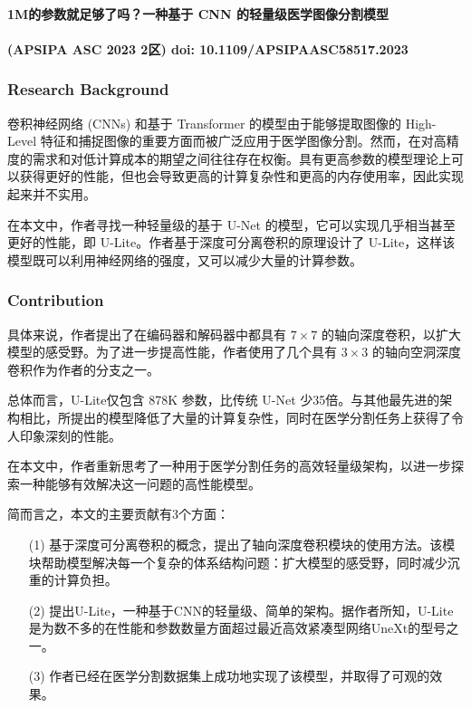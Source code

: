 \documentclass[a4paper, 10pt]{article}
\begin{document}
		\paragraph{1M的参数就足够了吗？一种基于 CNN 的轻量级医学图像分割模型}
		
		\paragraph{(APSIPA ASC 2023 2区) doi: 10.1109/APSIPAASC58517.2023}
		
			\subsubsection{Research Background}
			
			卷积神经网络 (CNNs) 和基于 Transformer 的模型由于能够提取图像的 High-Level 特征和捕捉图像的重要方面而被广泛应用于医学图像分割。然而，在对高精度的需求和对低计算成本的期望之间往往存在权衡。具有更高参数的模型理论上可以获得更好的性能，但也会导致更高的计算复杂性和更高的内存使用率，因此实现起来并不实用。
			
			在本文中，作者寻找一种轻量级的基于 U-Net 的模型，它可以实现几乎相当甚至更好的性能，即 U-Lite。作者基于深度可分离卷积的原理设计了 U-Lite，这样该模型既可以利用神经网络的强度，又可以减少大量的计算参数。
			
			\subsubsection{Contribution}
			
			具体来说，作者提出了在编码器和解码器中都具有 $7\times7$ 的轴向深度卷积，以扩大模型的感受野。为了进一步提高性能，作者使用了几个具有 $3\times3$ 的轴向空洞深度卷积作为作者的分支之一。
			
			总体而言，U-Lite仅包含 878K 参数，比传统 U-Net 少35倍。与其他最先进的架构相比，所提出的模型降低了大量的计算复杂性，同时在医学分割任务上获得了令人印象深刻的性能。
			
			在本文中，作者重新思考了一种用于医学分割任务的高效轻量级架构，以进一步探索一种能够有效解决这一问题的高性能模型。
			
			简而言之，本文的主要贡献有3个方面：

			\begin{itemize}
				\item[(1)] 基于深度可分离卷积的概念，提出了轴向深度卷积模块的使用方法。该模块帮助模型解决每一个复杂的体系结构问题：扩大模型的感受野，同时减少沉重的计算负担。
				
				\item[(2)] 提出U-Lite，一种基于CNN的轻量级、简单的架构。据作者所知，U-Lite是为数不多的在性能和参数数量方面超过最近高效紧凑型网络UneXt的型号之一。
				
				\item[(3)] 作者已经在医学分割数据集上成功地实现了该模型，并取得了可观的效果。
			\end{itemize}
			
\end{document}
